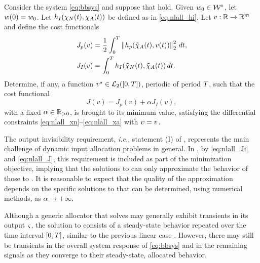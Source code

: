 \begin{problem}
  \label{prb:nlall_optcont}
  Consider the system \eqref{eq:bbsys} and suppose that  hold. Given $w_0\in\mathcal{W}^{\circ}$, let $w(0) = w_0$. Let $h_I(\chi_N(t),\chi_A(t))$ be defined as in \eqref{eq:nlall_hi}. Let $v : \mathbb{R} \rightarrow \mathbb{R}^m$ and define the cost functionals
  \begin{subequations}
    \label{eq:nlall_Js}
    \begin{align}
      J_p(v) & = \frac{1}{2} \int_0^T \left\Vert h_p(\tilde{\chi}_{A}(t), v(t)) \right\Vert_2^2\,dt,\label{eq:nlall_Jp} \\
      J_I(v) & = \int_0^T h_I(\tilde{\chi}_{N}(t),\tilde{\chi}_{A}(t))\,dt.\label{eq:nlall_Ji}
    \end{align}
  \end{subequations}
  Determine, if any, a function $v^\star\in\mathcal{L}_2([0, T])$, periodic of period $T$, such that the cost functional
  \begin{equation}
    \label{eq:nlall_J}
    J(v) = J_p(v) + \alpha J_I(v),
  \end{equation}
  with a fixed $\alpha\in\mathbb{R}_{>0}$, is brought to its minimum value, satisfying the differential constraints \eqref{eq:nlall_xn}--\eqref{eq:nlall_xa} with $\upsilon=v$.\closestatement
\end{problem}

\begin{remark}
  \label{rem:nlall_prbrel}
  The output invisibility requirement, \emph{i.e.}, statement (I) of , represents the main challenge of dynamic input allocation problems in general. In , by \eqref{eq:nlall_Ji} and \eqref{eq:nlall_J}, this requirement is included as part of the minimization objective, implying that the solutions to  can only approximate the behavior of those to . It is reasonable to expect that the quality of the approximation depends on the specific solutions to  that can be determined, using numerical methods, as $\alpha\rightarrow +\infty$.\closeremark
\end{remark}

\begin{remark}
  \label{rem:nlall_ssua}
  Although a generic allocator that solves  may generally exhibit transients in its output $\varsigma$, the solution to  consists of a steady-state behavior repeated over the time interval $[0,T]$, similar to the previous linear case \cite{galeani_optimal_2023}. However, there may still be transients in the overall system response of \eqref{eq:bbsys} and in the remaining signals as they converge to their steady-state, allocated behavior.\closeremark
\end{remark}

